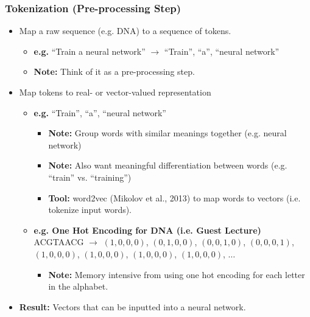 \subsubsection{Tokenization (Pre-processing Step)}
\begin{definition}
    \begin{itemize}
        \item Map a raw sequence (e.g. DNA) to a sequence of tokens.
        \begin{itemize}
            \item \textbf{e.g.} ``Train a neural network'' $\rightarrow$ ``Train'', ``a'', ``neural network''
            \item \textbf{Note:} Think of it as a pre-processing step. 
        \end{itemize}
        \item Map tokens to real- or vector-valued representation
        \begin{itemize}
            \item \textbf{e.g.} ``Train'', ``a'', ``neural network''
            \begin{itemize}
                \item \textbf{Note:} Group words with similar meanings together (e.g. neural network)
                \item \textbf{Note:} Also want meaningful differentiation between words (e.g. ``train'' vs. ``training'')
            \end{itemize}
            \begin{itemize}
                \item \textbf{Tool:} word2vec (Mikolov et al., 2013) to map words to vectors (i.e. tokenize input words).
            \end{itemize}
            \item \textbf{e.g. One Hot Encoding for DNA (i.e. Guest Lecture)} ACGTAACG $\rightarrow$ $(1,0,0,0)$, $(0,1,0,0)$, $(0,0,1,0)$, $(0,0,0,1)$, $(1,0,0,0)$, $(1,0,0,0)$, $(1,0,0,0)$, $(1,0,0,0)$, $\dots$
            \begin{itemize}
                \item \textbf{Note:} Memory intensive from using one hot encoding for each letter in the alphabet. 
            \end{itemize}
        \end{itemize}
        \item \textbf{Result:} Vectors that can be inputted into a neural network.
    \end{itemize}
\end{definition}


